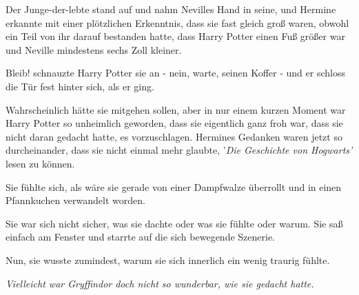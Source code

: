 Der Junge-der-lebte stand auf und nahm Nevilles Hand in seine, und Hermine
erkannte mit einer plötzlichen Erkenntnis, dass sie fast gleich groß waren,
obwohl ein Teil von ihr darauf bestanden hatte, dass Harry Potter einen Fuß
größer war und Neville mindestens sechs Zoll kleiner.

\glqq{}Bleib!\grqq{} schnauzte Harry Potter sie an - nein, warte, seinen Koffer -
und er schloss die Tür fest hinter sich, als er ging.

Wahrscheinlich hätte sie mitgehen sollen, aber in nur einem kurzen Moment war
Harry Potter so unheimlich geworden, dass sie eigentlich ganz froh war, dass sie
nicht daran gedacht hatte, es vorzuschlagen. Hermines Gedanken waren jetzt so
durcheinander, dass sie nicht einmal mehr glaubte, '\emph{Die Geschichte von
Hogwarts'} lesen zu können.

Sie fühlte sich, als wäre sie gerade von einer Dampfwalze überrollt und in einen
Pfannkuchen verwandelt worden.

Sie war sich nicht sicher, was sie dachte oder was sie fühlte oder warum. Sie
saß einfach am Fenster und starrte auf die sich bewegende Szenerie.

Nun, sie wusste zumindest, warum sie sich innerlich ein wenig traurig fühlte.

\emph{Vielleicht war Gryffindor doch nicht so wunderbar, wie sie gedacht hatte.
}